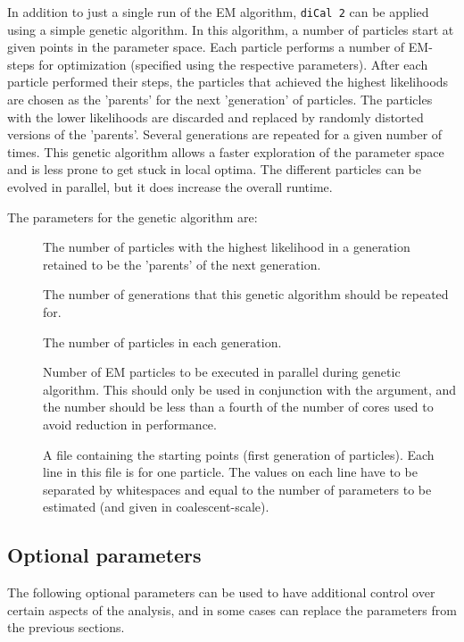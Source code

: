\documentclass{article}
\numberwithin{equation}{section}
\begin{document}
In addition to just a single run of the EM algorithm, \texttt{diCal 2} can be applied using a simple genetic algorithm. In this algorithm, a number of particles start at given points in the parameter space. Each particle performs a number of EM-steps for optimization (specified using the respective parameters). After each particle performed their steps, the particles that achieved the highest likelihoods are chosen as the 'parents' for the next 'generation' of particles. The particles with the lower likelihoods are discarded and replaced by randomly distorted versions of the 'parents'. Several generations are repeated for a given number of times. This genetic algorithm allows a faster exploration of the parameter space and is less prone to get stuck in local optima. The different particles can be evolved in parallel, but it does increase the overall runtime. 

The parameters for the genetic algorithm are:
\begin{description}
 	\item[] The number of particles with the highest likelihood in a generation retained to be the 'parents' of the next generation.
 	\item[] The number of generations that this genetic algorithm should be repeated for.
 	\item[] The number of particles in each generation.
	\item[] Number of EM particles to be executed in parallel during genetic algorithm. This should only be used in conjunction with the  argument, and the number should be less than a fourth of the number of cores used to avoid reduction in performance.
	\item[] A file containing the starting points (first generation of particles). Each line in this file is for one particle. The values on each line have to be separated by whitespaces and equal to the number of parameters to be estimated (and given in coalescent-scale).
\end{description}

\subsection{Optional parameters}
\label{sec_parameter_optional}

The following optional parameters can be used to have additional control over certain aspects of the analysis, and in some cases can replace the parameters from the previous sections.
\end{document}
